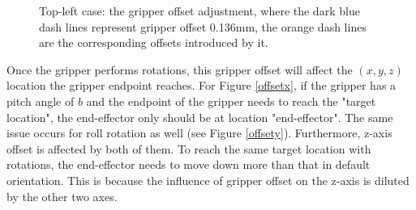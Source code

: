 \begin{figure}[H]
\centering
{}
\caption{Top-left case: the gripper offset adjustment, where the dark blue dash lines represent gripper offset 0.136mm, the orange dash lines are the corresponding offsets introduced by it.}
\label{offset}
\end{figure}


Once the gripper performs rotations, this gripper offset will affect the $(x, y, z)$ location the gripper endpoint reaches. For Figure \ref{offsetx}, if the gripper has a pitch angle of $b$ and the endpoint of the gripper needs to reach the "target location", the end-effector only should be at location "end-effector". The same issue occurs for roll rotation as well (see Figure \ref{offsety}). Furthermore, z-axis offset is affected by both of them. To reach the same target location with rotations, the end-effector needs to move down more than that in default orientation. This is because the influence of gripper offset on the z-axis is diluted by the other two axes.

